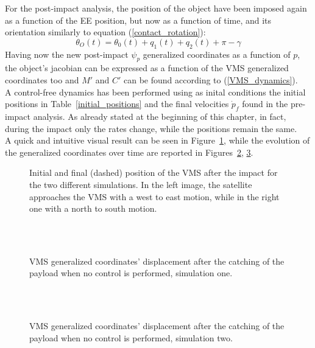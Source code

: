 \documentclass[a4paper,12pt,oneside]{report}
\begin{document}
For the post-impact analysis, the position of the object have been imposed again as a function of the EE position, but now as a function of time, and its orientation similarly to equation (\ref{contact_rotation}):
\begin{equation}
  \theta_O(t)=\theta_0(t)+q_1(t)+q_2(t)+\pi-\gamma
\end{equation}
Having now the new post-impact $\psi_p$ generalized coordinates as a function of $p$, the object's jacobian can be expressed as a function of the VMS generalized coordinates too and $M'$ and $C'$ can be found according to (\ref{VMS_dynamics}).\\
A control-free dynamics has been performed using as inital conditions the initial positions in Table~\ref{initial_positions} and the final velocities $\dot{p}_f$ found in the pre-impact analysis. As already stated at the beginning of this chapter, in fact, during the impact only the rates change, while the positions remain the same.\\
A quick and intuitive visual result can be seen in Figure~\ref{no_control_result}, while the evolution of the generalized coordinates over time are reported in Figures~\ref{free_motion_1}, \ref{free_motion_2}.\\
\begin{figure}
  \centering
  \caption{Initial and final (dashed) position of the VMS after the impact for the two different simulations. In the left image, the satellite approaches the VMS with a west to east motion, while in the right one with a north to south motion.}
  \label{no_control_result}
\end{figure}
\begin{figure}
  \centering
  \subfloat
  {} \quad
\subfloat
  {} \\
  \subfloat
  {} \quad
  \subfloat
  {}\\
  \subfloat
  {}
  \caption{VMS generalized coordinates' displacement after the catching of the payload when no control is performed, simulation one.}
  \label{free_motion_1}
\end{figure}
\begin{figure}
  \centering
  \subfloat
  {}\quad
\subfloat
  {} \\
  \subfloat
  {}\quad
  \subfloat
  {}\\
  \subfloat
  {}
  \caption{VMS generalized coordinates' displacement after the catching of the payload when no control is performed, simulation two.}
  \label{free_motion_2}
\end{figure}
\end{document}
